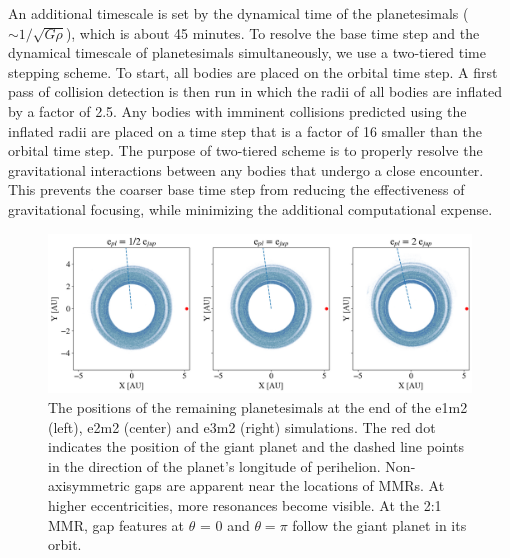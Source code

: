 \documentclass[twocolumn]{aastex63}
\begin{document}
An additional timescale is set by the dynamical time of the planetesimals ($\sim 1/\sqrt{G \rho}$), which is about 45 minutes. To 
resolve the base time step and the dynamical timescale of planetesimals simultaneously, we use a two-tiered time stepping scheme. 
To start, all bodies are placed on the orbital time step. A first pass of collision detection is then run in 
which the radii of all bodies are inflated by a factor of 2.5. Any bodies with imminent collisions predicted using the inflated radii are 
placed on a time step that is a factor of 16 smaller than the orbital time step. The purpose of two-tiered scheme is to properly resolve 
the gravitational interactions between any bodies that undergo a close encounter. This prevents the coarser base time step from 
reducing the effectiveness of gravitational focusing, while minimizing the additional computational expense.

\begin{figure}
\begin{center}
    \includegraphics[width=\textwidth]{figures/xy.png}
    \caption{The positions of the remaining planetesimals at the end of the e1m2 (left), e2m2 (center) and e3m2 (right) simulations. The red dot 
    indicates the position of the giant planet and the dashed line points in the direction of the planet's longitude of perihelion. Non-axisymmetric gaps 
    are apparent near the locations of MMRs. At higher eccentricities, more resonances become visible. At the 2:1 MMR, gap features at $\theta$ = 0 
    and $\theta = \pi$ follow the giant planet in its orbit.\label{fig:xy}}
\end{center}
\end{figure}
\end{document}
